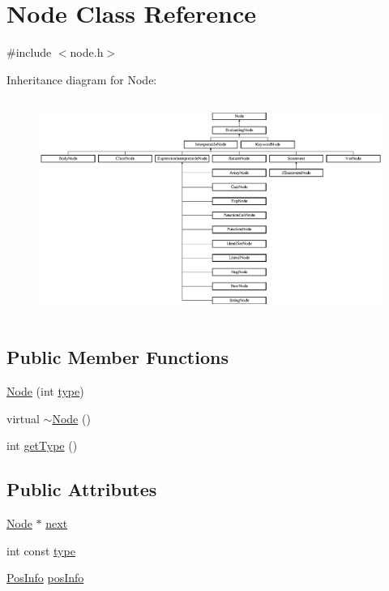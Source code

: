 \hypertarget{classNode}{}\section{Node Class Reference}
\label{classNode}


{\ttfamily \#include $<$node.\+h$>$}

Inheritance diagram for Node\+:\begin{figure}[H]
\begin{center}
\leavevmode
\includegraphics[height=7.140255cm]{classNode}
\end{center}
\end{figure}
\subsection*{Public Member Functions}
\begin{DoxyCompactItemize}
\item 
\hyperlink{classNode_a81891cf87be70506850d76a39dad29dd}{Node} (int \hyperlink{classNode_af4f536b1b3f60e197fe364ba56022291}{type})
\item 
virtual \hyperlink{classNode_af5e3fa79300bf5f3f2f3ecae6e795a94}{$\sim$\+Node} ()
\item 
int \hyperlink{classNode_a8de16678e4b507d5caee3fe52bfa053b}{get\+Type} ()
\end{DoxyCompactItemize}
\subsection*{Public Attributes}
\begin{DoxyCompactItemize}
\item 
\hyperlink{classNode}{Node} $\ast$ \hyperlink{classNode_a2559a716f69ccaa76d648d9f1b83065e}{next}
\item 
int const \hyperlink{classNode_af4f536b1b3f60e197fe364ba56022291}{type}
\item 
\hyperlink{classPosInfo}{Pos\+Info} \hyperlink{classNode_aa0e8a1e5aebdbe33183001b5a1c57111}{pos\+Info}
\end{DoxyCompactItemize}


